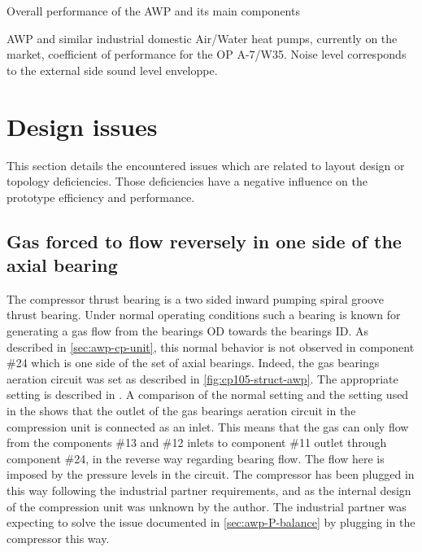 \begin{table}[htbp]
  \begin{center}
    \footnotesize
    
  \end{center}
  \caption{Overall performance of the AWP and its main components}
  \label{tab:awp-performances-summary}
\end{table}

\begin{table}[htbp]
  \begin{center}
    \footnotesize
    
  \end{center}
  \caption[AWP and similar industrial domestic heat pumps coefficient
  of performance]{AWP and similar industrial domestic Air/Water heat
    pumps, currently on the market, coefficient of performance for the
    OP A-7/W35. Noise level corresponds to the external side sound
    level enveloppe.}
  \label{tab:awp-indus-products-comparison}
\end{table}

\section{Design issues}
\label{sec:awp-design-issues}

This section details the encountered issues which are related to
\AWP{} layout design or topology deficiencies. Those deficiencies have
a negative influence on the prototype efficiency and performance.


\subsection{Gas forced to flow reversely in one side of
  the axial bearing}
\label{sec:axial-is-reversed}

The compressor thrust bearing is a two sided inward pumping spiral
groove thrust bearing. Under normal operating conditions such a
bearing is known for generating a gas flow from the bearings OD
towards the bearings ID. As described in \cref{sec:awp-cp-unit}, this
normal behavior is not observed in component \#24 which is one side of
the set of axial bearings. Indeed, the gas bearings aeration circuit
was set as described in \cref{fig:cp105-struct-awp}. The appropriate
setting is described in . A comparison of
the normal setting and the setting used in the \AWP{} shows that the
outlet of the gas bearings aeration circuit in the compression unit is
connected as an inlet. This means that the gas can only flow from the
components \#13 and \#12 inlets to component \#11 outlet through
component \#24, in the reverse way regarding bearing flow. The flow
here is imposed by the pressure levels in the circuit. The compressor
has been plugged in this way following the industrial partner
requirements, and as the internal design of the compression unit was
unknown by the author. The industrial partner was expecting to solve
the issue documented in \cref{sec:awp-P-balance} by plugging in the
compressor this way.

